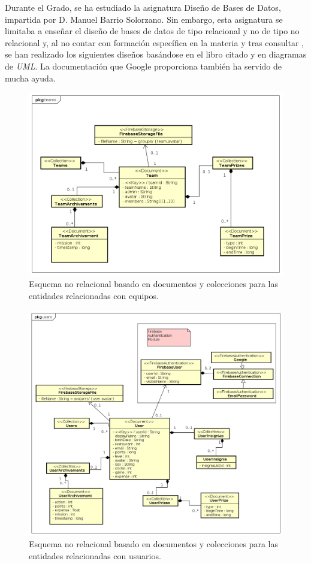 \documentclass[twoside]{report}
\begin{document}
Durante el Grado, se ha estudiado la asignatura Diseño de Bases de Datos, impartida por D. Manuel Barrio Solorzano. Sin embargo, esta asignatura se limitaba a enseñar el diseño de bases de datos de tipo relacional y no de tipo no relacional y, al no contar con formación específica en la materia y tras consultar \cite{databasedesign}, se han realizado los siguientes diseños basándose en el libro citado y en diagramas de \textit{UML}. La documentación que Google proporciona \cite{fireference} también ha servido de mucha ayuda.

\begin{figure}[H]
\centering
\includegraphics[scale=0.5]{images/databaseNRteams}
\caption{Esquema no relacional basado en documentos y colecciones para las entidades relacionadas con equipos.}
\label{nrteams}
\end{figure}

\begin{figure}[H]
\centering
\includegraphics[scale=0.5]{images/databaseNRusers}
\caption{Esquema no relacional basado en documentos y colecciones para las entidades relacionadas con usuarios.}
\label{nrusers}
\end{figure}
\end{document}
